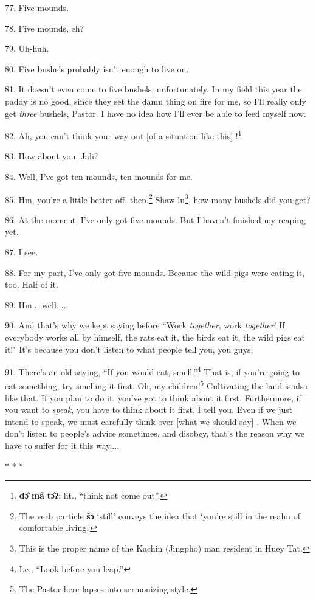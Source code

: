77. Five mounds.

78. Five mounds, eh?

79. Uh-huh.

80. Five bushels probably isn't enough to live on.

81. It doesn't even come to five bushels, unfortunately. In my field this year
the paddy is no good, since they set the damn thing on fire for me, so I'll really
only get \textit{three} bushels, Pastor. I have no idea how I'll ever be able to
feed myself now.

82. Ah, you can't think your way out [of a situation like this] !\footnote{\textbf{dɔ̂} \textbf{mâ} \textbf{tɔ̂ʔ}: lit., ``think not come out''.}

83. How about you, Jali?

84. Well, I've got ten mounds, ten mounds for me.

85. Hm, you're a little better off, then.\footnote{The verb particle \textbf{šɔ} `still' conveys the idea that `you're still in the realm of comfortable living.'} Shaw-lu\footnote{This is the proper name of the Kachin (Jingpho) man resident in Huey Tat.}, how many bushels
did you get?

86. At the moment, I've only got five mounds. But I haven't finished my reaping
yet.

87. I see.

88. For my part, I've only got five mounds. Because the wild pigs were eating it,
too. Half of it.

89. Hm... well....

90. And that's why we kept saying before ``Work\textit{ together}, work
\textit{together}! If everybody works all by himself, the rats eat it, the birds
eat it, the wild pigs eat it!" It's because you don't listen to what people
tell you, you guys!

91. There's an old saying, ``If you would eat, smell.''\footnote{I.e., ``Look before you leap.''} That
is, if you're going to eat something, try smelling it first. Oh, my children!\footnote{The Pastor here lapses into sermonizing style.}
Cultivating the land is also like that. If you plan to do it, you've got to think
about it first. Furthermore, if you want to \textit{speak}, you have to think about
it first, I tell you. Even if we just intend to speak, we must carefully think
over [what we should say] . When we don't listen to people's advice sometimes,
and disobey, that's the reason why we have to suffer for it this way....

\begin{center}
* * *
\end{center}

